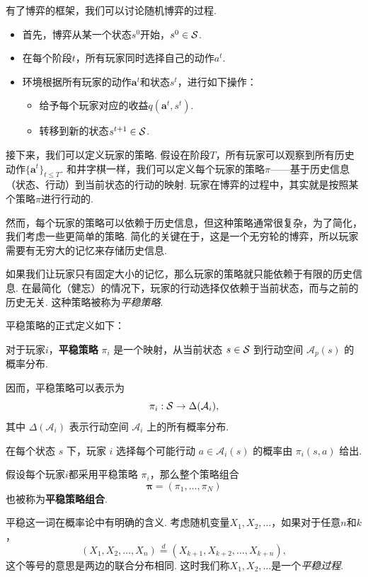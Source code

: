 有了博弈的框架，我们可以讨论随机博弈的过程. 
\begin{itemize}
    \item 首先，博弈从某一个状态$s^0$开始，$s^0\in \mathcal S$.
    \item 在每个阶段$t$，所有玩家同时选择自己的动作$a^t$.
    \item 环境根据所有玩家的动作$\boldsymbol a^t$和状态$s^t$，进行如下操作：
    \begin{itemize}
        \item 给予每个玩家对应的收益$q(\boldsymbol a^t, s^t)$.
        \item 转移到新的状态$s^{t+1}\in \mathcal S$.
    \end{itemize}
\end{itemize}
    
接下来，我们可以定义玩家的策略. 假设在阶段$T$，所有玩家可以观察到所有历史动作$\{\boldsymbol a^t\}_{t\leq T}$. 和井字棋一样，我们可以定义每个玩家的策略$\pi$——基于历史信息（状态、行动）到当前状态的行动的映射. 玩家在博弈的过程中，其实就是按照某个策略$\pi$进行行动的. 

然而，每个玩家的策略可以依赖于历史信息，但这种策略通常很复杂，为了简化，我们考虑一些更简单的策略. 简化的关键在于，这是一个无穷轮的博弈，所以玩家需要有无穷大的记忆来存储历史信息. 

如果我们让玩家只有固定大小的记忆，那么玩家的策略就只能依赖于有限的历史信息. 在最简化（健忘）的情况下，玩家的行动选择仅依赖于当前状态，而与之前的历史无关. 这种策略被称为\textit{平稳策略}.

平稳策略的正式定义如下：

\begin{definition}[平稳策略]
    对于玩家$i$，\textbf{平稳策略} $\pi_i$ 是一个映射，从当前状态 $s \in \mathcal S$ 到行动空间 $\mathcal{A}_p(s)$ 的概率分布. 
    
    因而，平稳策略可以表示为 
    \[\pi_i : \mathcal S \rightarrow \Delta(\mathcal{A}_i),\]
    其中 $\Delta(\mathcal{A}_i)$ 表示行动空间 $\mathcal{A}_i$ 上的所有概率分布. 
    
    在每个状态 $s$ 下，玩家 $i$ 选择每个可能行动 $a \in \mathcal{A}_i(s)$ 的概率由 $\pi_i(s,a)$ 给出. 
    
    假设每个玩家$i$都采用平稳策略 $\pi_i$，那么整个策略组合
    \[\boldsymbol \pi=(\pi_1,\dots, \pi_N)\]
    也被称为\textbf{平稳策略组合}.
\end{definition}

平稳这一词在概率论中有明确的含义. 考虑随机变量$X_1,X_2,\dots$，如果对于任意$n$和$k$，
\[(X_1,X_2,\dots,X_n)\stackrel{d}{=} (X_{k+1},X_{k+2},\dots,X_{k+n}),\]
这个等号的意思是两边的联合分布相同. 这时我们称$X_1,X_2,\dots$是一个\textit{平稳过程}.

